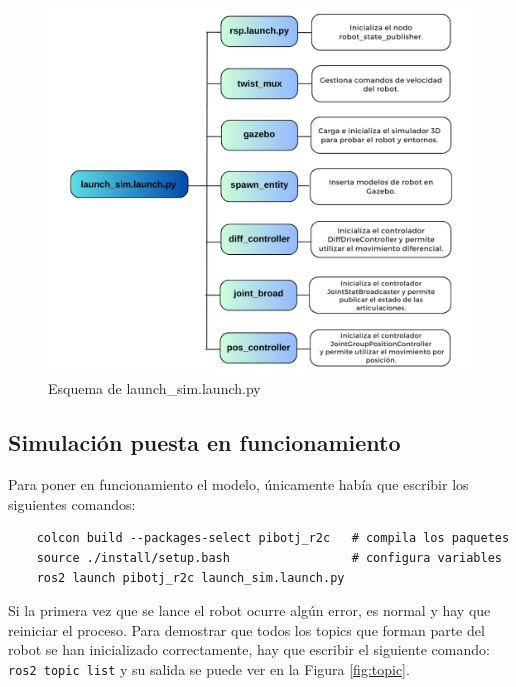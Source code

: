  \begin{figure} [h!]
	\begin{center}
		\includegraphics[width=14cm]{figs/cap6/diagram.png}
	\end{center}
	\caption{Esquema de launch\_sim.launch.py}
	\label{fig:launcherdiagram}
\end{figure}


\subsection{Simulación puesta en funcionamiento}
\label{subsec:funsimulacion}

Para poner en funcionamiento el modelo, únicamente había que escribir los siguientes comandos:
\begin{verbatim}
	colcon build --packages-select pibotj_r2c   # compila los paquetes
	source ./install/setup.bash                 # configura variables 
	ros2 launch pibotj_r2c launch_sim.launch.py
\end{verbatim} 

Si la primera vez que se lance el robot ocurre algún error, es normal y hay que reiniciar el proceso. Para demostrar que todos los topics que forman parte del robot se han inicializado correctamente, hay que escribir el siguiente comando:  \verb|ros2 topic list| y su salida se puede ver en la Figura \ref{fig:topic}.


